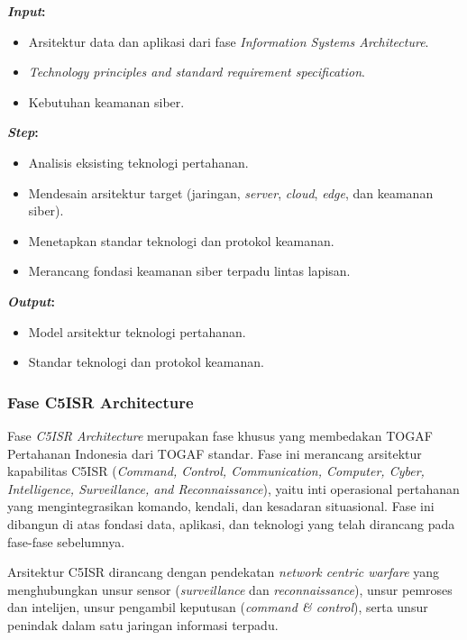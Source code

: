 \textbf{\textit{Input}:}
\begin{itemize}
  \item Arsitektur data dan aplikasi dari fase \textit{Information Systems Architecture}.
  \item \textit{Technology principles and standard requirement specification}.
  \item Kebutuhan keamanan siber.
\end{itemize}
\textbf{\textit{Step}:}
\begin{itemize}
  \item Analisis eksisting teknologi pertahanan.
  \item Mendesain arsitektur target (jaringan, \textit{server}, \textit{cloud}, \textit{edge}, dan keamanan siber).
  \item Menetapkan standar teknologi dan protokol keamanan.
  \item Merancang fondasi keamanan siber terpadu lintas lapisan.
\end{itemize}
\textbf{\textit{Output}:}
\begin{itemize}
  \item Model arsitektur teknologi pertahanan.
  \item Standar teknologi dan protokol keamanan.
\end{itemize}

\subsubsection{Fase C5ISR Architecture}
Fase \textit{C5ISR Architecture} merupakan fase khusus yang membedakan TOGAF Pertahanan Indonesia dari TOGAF standar.
Fase ini merancang arsitektur kapabilitas C5ISR (\textit{Command, Control, Communication, Computer, Cyber, Intelligence, Surveillance, and Reconnaissance}), yaitu inti operasional pertahanan yang mengintegrasikan komando, kendali, dan kesadaran situasional.
Fase ini dibangun di atas fondasi data, aplikasi, dan teknologi yang telah dirancang pada fase-fase sebelumnya.

Arsitektur C5ISR dirancang dengan pendekatan \textit{network centric warfare} yang menghubungkan unsur sensor (\textit{surveillance} dan \textit{reconnaissance}), unsur pemroses dan intelijen, unsur pengambil keputusan (\textit{command \& control}), serta unsur penindak dalam satu jaringan informasi terpadu.

